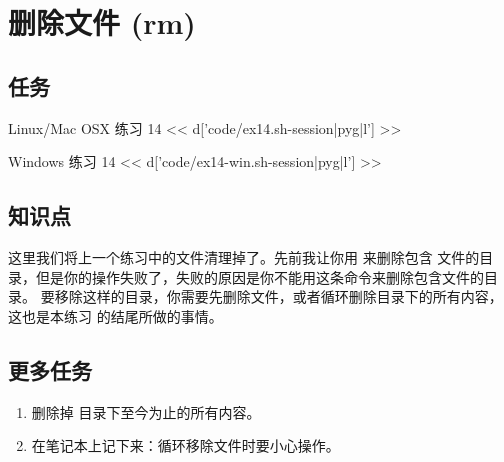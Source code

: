 \chapter{删除文件 (rm)}

\section{任务}

\begin{code}{Linux/Mac OSX 练习 14}
<< d['code/ex14.sh-session|pyg|l'] >>
\end{code}

\begin{code}{Windows 练习 14}
<< d['code/ex14-win.sh-session|pyg|l'] >>
\end{code}

\section{知识点}

这里我们将上一个练习中的文件清理掉了。先前我让你用  来删除包含
文件的目录，但是你的操作失败了，失败的原因是你不能用这条命令来删除包含文件的目录。
要移除这样的目录，你需要先删除文件，或者循环删除目录下的所有内容，这也是本练习
的结尾所做的事情。

\section{更多任务}

\begin{enumerate}
\item 删除掉  目录下至今为止的所有内容。
\item 在笔记本上记下来：循环移除文件时要小心操作。
\end{enumerate}

